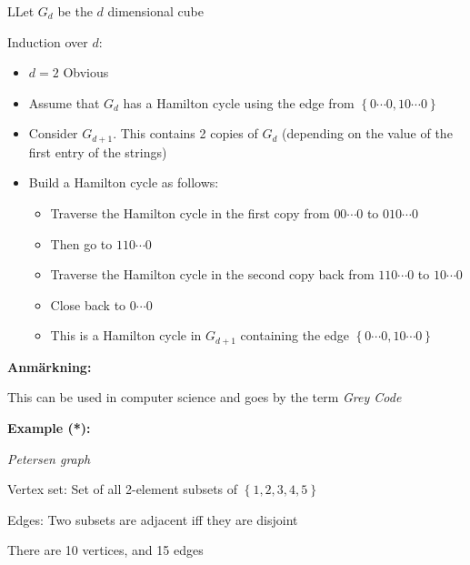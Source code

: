 \begin{prf}
  LLet $G_d$ be the $d$ dimensional cube
  \par\bigskip
  \noindent Induction over $d$:\par
  \begin{itemize}
    \item $d = 2$ Obvious\par
  \item Assume that $G_d$ has a Hamilton cycle using the edge from $\left\{0\cdots 0,10\cdots0\right\}$\par
  \item Consider $G_{d+1}$. This contains 2 copies of $G_d$ (depending on the value of the first entry of the strings)\par
  \item Build a Hamilton cycle as follows:\par
    \begin{itemize}
      \item Traverse the Hamilton cycle in the first copy from $00\cdots0$ to $010\cdots0$\par
      \item Then go to $110\cdots0$ \par
      \item Traverse the Hamilton cycle in the second copy back from $110\cdots0$ to $10\cdots0$\par
      \item Close back to $0\cdots0$\par
    \item This is a Hamilton cycle in $G_{d+1}$ containing the edge $\left\{0\cdots0,10\cdots0\right\}$
    \end{itemize}
  \end{itemize}
\end{prf}
\par\bigskip
\noindent\textbf{Anmärkning:}\par
\noindent This can be used in computer science and goes by the term \textit{Grey Code}
\par\bigskip
\noindent\textbf{Example (*):}\par
\noindent\textit{Petersen graph}\par
Vertex set: Set of all 2-element subsets of $\left\{1,2,3,4,5\right\}$\par
Edges: Two subsets are adjacent iff they are disjoint
\par\bigskip
\noindent There are 10 vertices, and 15 edges
\par\bigskip
